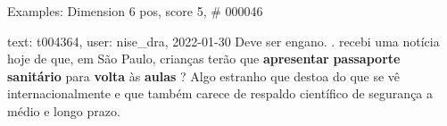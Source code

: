 \begin{frame}{Examples: Dimension 6 pos, score 5, \# 000046}
\footnotesize
\begin{exampleblock}{text: t004364, user: nise\_dra, 2022-01-30}
Deve ser engano. . recebi uma notícia hoje de que, em São Paulo, crianças terão 
que \textbf{apresentar} \textbf{passaporte} \textbf{sanitário} para 
\textbf{volta} às \textbf{aulas} ? Algo estranho que destoa do que se vê 
internacionalmente e que também carece de respaldo científico de segurança a 
médio e longo prazo. 
\end{exampleblock}
\end{frame}
